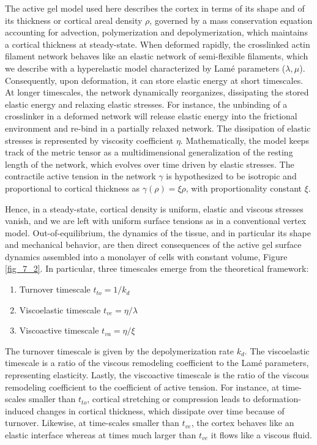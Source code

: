 The active gel model used here describes the cortex in terms of its shape and of its thickness or cortical areal density \(\rho\), governed by a mass conservation equation accounting for advection, polymerization and depolymerization, which maintains a cortical thickness at steady-state. When deformed rapidly, the crosslinked actin filament network behaves like an elastic network of semi-flexible filaments, which we describe with a hyperelastic model characterized by Lamé parameters  (\(\lambda,\mu\)). Consequently, upon deformation, it can store elastic energy at short timescales. At longer timescales, the network dynamically reorganizes, dissipating the stored elastic energy and relaxing elastic stresses. For instance, the unbinding of a crosslinker in a deformed network will release elastic energy into the frictional environment and re-bind in a partially relaxed network. The dissipation of elastic stresses is represented by viscosity coefficient \(\eta\). Mathematically, the model keeps track of the metric tensor as a multidimensional generalization of the resting length of the network, which evolves over time driven by elastic stresses. The contractile active tension in the network \(\gamma\) is hypothesized to be isotropic and  proportional to cortical thickness as $\gamma(\rho) = \xi \rho$, with proportionality constant  \(\xi\). 

Hence, in a steady-state, cortical density is uniform, elastic and viscous stresses vanish, and we are left with uniform surface tensions as in a conventional vertex model. Out-of-equilibrium, the dynamics of the tissue, and in particular its shape and mechanical behavior, are then direct consequences of the active gel surface dynamics assembled into a monolayer of cells with constant volume, Figure \ref{fig_7_2}. In particular, three timescales emerge from the theoretical framework: 
\begin{enumerate}
	\item Turnover timescale \(t_{to} = 1/k_{d}\)
	\item Viscoelastic timescale \(t_{ve} = \eta/\lambda\)
	\item Viscoactive timescale \(t_{va} = \eta/\xi\)
\end{enumerate}

The turnover timescale is given by the depolymerization rate \(k_{d}\). The viscoelastic timescale is a ratio of the viscous remodeling coefficient to the Lamé parameters, representing elasticity. Lastly, the viscoactive timescale is the ratio of the viscous remodeling coefficient to the coefficient of active tension. For instance, at time-scales smaller than $t_{to}$, cortical stretching or compression leads to deformation-induced changes in cortical thickness, which dissipate over time because of turnover. Likewise, at time-scales smaller than $t_{ve}$, the cortex behaves like an elastic interface whereas at times much larger than $t_{ve}$ it flows like a viscous fluid. 

